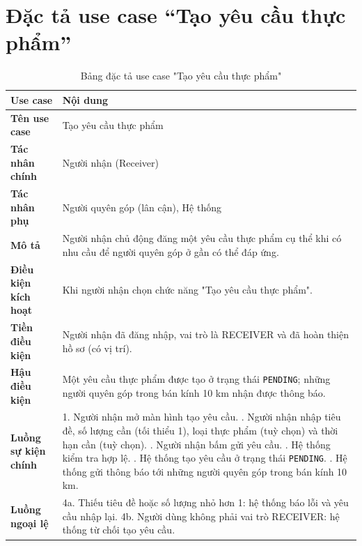\documentclass[../main.tex]{subfiles}
\begin{document}
\section{Đặc tả use case ``Tạo yêu cầu thực phẩm''}

\begingroup
\renewcommand{\arraystretch}{1.45}
\begin{longtable}{|p{3.5cm}|p{11.5cm}|}
\caption{Bảng đặc tả use case "Tạo yêu cầu thực phẩm"}
\label{tab:uc_tao_yeu_cau}\\
\hline
\textbf{Use case} & \textbf{Nội dung} \\ \hline
\textbf{Tên use case} & Tạo yêu cầu thực phẩm \\ \hline
\textbf{Tác nhân chính} & Người nhận (Receiver) \\ \hline
\textbf{Tác nhân phụ} & Người quyên góp (lân cận), Hệ thống \\ \hline
\textbf{Mô tả} & Người nhận chủ động đăng một yêu cầu thực phẩm cụ thể khi có nhu cầu để người quyên góp ở gần có thể đáp ứng. \\ \hline
\textbf{Điều kiện kích hoạt} & Khi người nhận chọn chức năng "Tạo yêu cầu thực phẩm". \\ \hline
\textbf{Tiền điều kiện} & Người nhận đã đăng nhập, vai trò là RECEIVER và đã hoàn thiện hồ sơ (có vị trí). \\ \hline
\textbf{Hậu điều kiện} & Một yêu cầu thực phẩm được tạo ở trạng thái \texttt{PENDING}; những người quyên góp trong bán kính 10 km nhận được thông báo. \\ \hline
\textbf{Luồng sự kiện chính} &
1. Người nhận mở màn hình tạo yêu cầu. \newline
2. Người nhận nhập tiêu đề, số lượng cần (tối thiểu 1), loại thực phẩm (tuỳ chọn) và thời hạn cần (tuỳ chọn). \newline
3. Người nhận bấm gửi yêu cầu. \newline
4. Hệ thống kiểm tra hợp lệ. \newline
5. Hệ thống tạo yêu cầu ở trạng thái \texttt{PENDING}. \newline
6. Hệ thống gửi thông báo tới những người quyên góp trong bán kính 10 km. \\ \hline
\textbf{Luồng ngoại lệ} &
4a. Thiếu tiêu đề hoặc số lượng nhỏ hơn 1: hệ thống báo lỗi và yêu cầu nhập lại. \newline
4b. Người dùng không phải vai trò RECEIVER: hệ thống từ chối tạo yêu cầu. \\ \hline
\end{longtable}
\endgroup
\end{document}
